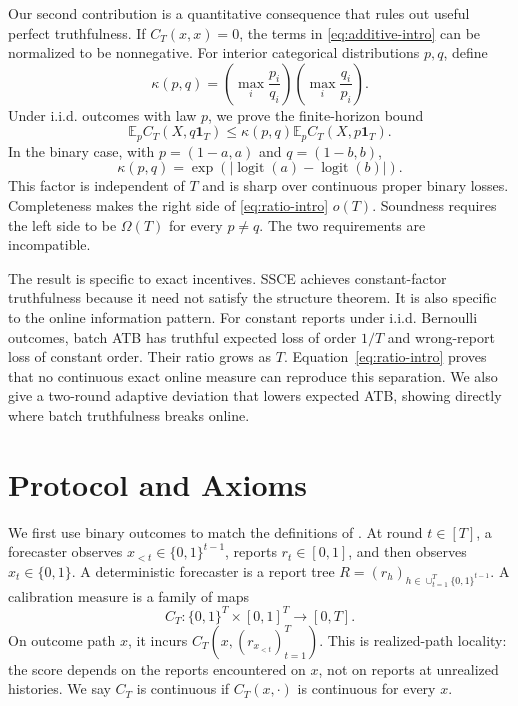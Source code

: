 \documentclass[twoside]{article}
\newcommand{\E}{\mathbb E}
\newcommand{\1}{\mathbf 1}
\begin{document}
Our second contribution is a quantitative consequence that rules out useful perfect truthfulness. If $C_T(x,x)=0$, the terms in \eqref{eq:additive-intro} can be normalized to be nonnegative. For interior categorical distributions $p,q$, define
\begin{equation}
 \kappa(p,q)=\left(\max_i\frac{p_i}{q_i}\right)
             \left(\max_i\frac{q_i}{p_i}\right).
 \label{eq:kappa-intro}
\end{equation}
Under i.i.d. outcomes with law $p$, we prove the finite-horizon bound
\begin{equation}
 \E_p C_T(X,q\1_T)
 \leq \kappa(p,q)\E_p C_T(X,p\1_T).
 \label{eq:ratio-intro}
\end{equation}
In the binary case, with $p=(1-a,a)$ and $q=(1-b,b)$,
\begin{equation}
 \kappa(p,q)=
 \exp\!\left(|\operatorname{logit}(a)-\operatorname{logit}(b)|\right).
\end{equation}
This factor is independent of $T$ and is sharp over continuous proper binary losses. Completeness makes the right side of \eqref{eq:ratio-intro} $o(T)$. Soundness requires the left side to be $\Omega(T)$ for every $p\ne q$. The two requirements are incompatible.

The result is specific to exact incentives. SSCE achieves constant-factor truthfulness because it need not satisfy the structure theorem. It is also specific to the online information pattern. For constant reports under i.i.d. Bernoulli outcomes, batch ATB has truthful expected loss of order $1/T$ and wrong-report loss of constant order. Their ratio grows as $T$. Equation~\eqref{eq:ratio-intro} proves that no continuous exact online measure can reproduce this separation. We also give a two-round adaptive deviation that lowers expected ATB, showing directly where batch truthfulness breaks online.

\section{Protocol and Axioms}
\label{sec:setting}

We first use binary outcomes to match the definitions of \citet{haghtalab2024truthfulness}. At round $t\in[T]$, a forecaster observes $x_{<t}\in\{0,1\}^{t-1}$, reports $r_t\in[0,1]$, and then observes $x_t\in\{0,1\}$. A deterministic forecaster is a report tree $R=(r_h)_{h\in\cup_{t=1}^T\{0,1\}^{t-1}}$. A calibration measure is a family of maps
\begin{equation*}
 C_T:\{0,1\}^T\times[0,1]^T\longrightarrow[0,T].
\end{equation*}
On outcome path $x$, it incurs $C_T(x,(r_{x_{<t}})_{t=1}^T)$. This is realized-path locality: the score depends on the reports encountered on $x$, not on reports at unrealized histories. We say $C_T$ is continuous if $C_T(x,\cdot)$ is continuous for every $x$.
\end{document}
